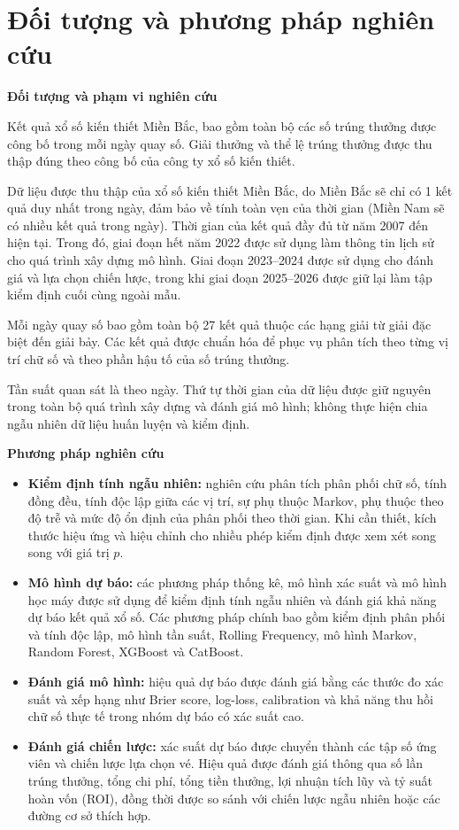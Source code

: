 \chapter*{Đối tượng và phương pháp nghiên cứu}

\textbf{Đối tượng và phạm vi nghiên cứu}

Kết quả xổ số kiến thiết Miền Bắc, bao gồm toàn bộ các số trúng thưởng được công bố trong mỗi ngày quay số. 
Giải thưởng và thể lệ trúng thưởng được thu thập đúng theo công bố của công ty xổ số kiến thiết.

Dữ liệu được thu thập của xổ số kiến thiết Miền Bắc, do Miền Bắc sẽ chỉ có 1 kết quả duy nhất trong ngày, đảm bảo về tính toàn vẹn của thời gian (Miền Nam sẽ có nhiều kết quả trong ngày). Thời gian của kết quả đầy đủ từ năm 2007 đến hiện tại. 
Trong đó, giai đoạn hết năm 2022 được sử dụng làm thông tin lịch sử cho quá 
trình xây dựng mô hình. Giai đoạn 2023--2024 được sử dụng cho đánh giá và lựa 
chọn chiến lược, trong khi giai đoạn 2025--2026 được giữ lại làm tập kiểm định 
cuối cùng ngoài mẫu.

Mỗi ngày quay số bao gồm toàn bộ 27 kết quả thuộc các hạng giải từ 
giải đặc biệt đến giải bảy. Các kết quả được chuẩn hóa để phục vụ phân tích 
theo từng vị trí chữ số và theo phần hậu tố của số trúng thưởng.
	
Tần suất quan sát là theo ngày. Thứ tự thời gian của dữ liệu được giữ 
nguyên trong toàn bộ quá trình xây dựng và đánh giá mô hình; không thực hiện 
chia ngẫu nhiên dữ liệu huấn luyện và kiểm định.
	

\textbf{Phương pháp nghiên cứu}

\begin{itemize}
	\item \textbf{Kiểm định tính ngẫu nhiên:} nghiên cứu phân tích phân phối chữ 
	số, tính đồng đều, tính độc lập giữa các vị trí, sự phụ thuộc Markov, phụ 
	thuộc theo độ trễ và mức độ ổn định của phân phối theo thời gian. Khi cần 
	thiết, kích thước hiệu ứng và hiệu chỉnh cho nhiều phép kiểm định được xem xét 
	song song với giá trị $p$.
	
	\item \textbf{Mô hình dự báo:} các phương pháp thống kê, mô hình xác 
	suất và mô hình học máy được sử dụng để kiểm định tính ngẫu nhiên và đánh giá 
	khả năng dự báo kết quả xổ số. Các phương pháp chính bao gồm kiểm định phân 
	phối và tính độc lập, mô hình tần suất, Rolling Frequency, mô hình Markov, 
	Random Forest, XGBoost và CatBoost.
	
	\item \textbf{Đánh giá mô hình:} hiệu quả dự báo được đánh giá bằng các thước 
	đo xác suất và xếp hạng như Brier score, log-loss, calibration và khả năng 
	thu hồi chữ số thực tế trong nhóm dự báo có xác suất cao.
	
	\item \textbf{Đánh giá chiến lược:} xác suất dự báo được chuyển thành các tập 
	số ứng viên và chiến lược lựa chọn vé. Hiệu quả được đánh giá thông qua số lần 
	trúng thưởng, tổng chi phí, tổng tiền thưởng, lợi nhuận tích lũy và tỷ suất 
	hoàn vốn (ROI), đồng thời được so sánh với chiến lược ngẫu nhiên hoặc các 
	đường cơ sở thích hợp.
\end{itemize}
